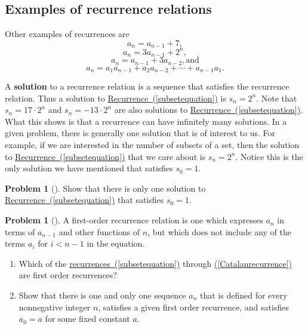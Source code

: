 \documentclass[10pt,]{book}
\newcommand{\terminology}[1]{\textbf{#1}}
\theoremstyle{plain}
\theoremstyle{definition}
\newtheorem{activity}[project]{Problem}
\theoremstyle{definition}
\numberwithin{equation}{chapter}
\newcommand{\lt}{<}
\begin{document}
\subsection[{Examples of recurrence relations}]{Examples of recurrence relations}\label{subsection-17}
Other examples of recurrences are%
\begin{equation}
a_n = a_{n-1} +
7,\label{arithmeticexample}
\end{equation}
%
\begin{equation}
a_n =3a_{n-1} + 2^n,\label{geometricdriven}
\end{equation}
%
\begin{equation}
a_n = a_{n-1} + 3a_{n-2},\mbox{
and}\label{secondorderlinear}
\end{equation}
%
\begin{equation}
a_n= a_1a_{n-1} + a_2a_{n-2}+\cdots +
a_{n-1}a_1.\label{Catalanrecurrence}
\end{equation}
%
\par
A \terminology{solution} to a recurrence relation is a sequence that satisfies the recurrence relation. Thus a solution to \hyperref[subsetequation]{Recurrence~(\ref{subsetequation})} is \(s_n =2^n\). Note that \(s_n=17\cdot2^n\) and \(s_n=-13\cdot2^n\) are also solutions to \hyperref[subsetequation]{Recurrence~(\ref{subsetequation})}. What this shows is that a recurrence can have infinitely many solutions. In a given problem, there is generally one solution that is of interest to us. For example, if we are interested in the number of subsets of a set, then the solution to \hyperref[subsetequation]{Recurrence~(\ref{subsetequation})} that we care about is \(s_n=2^n\). Notice this is the only solution we have mentioned that satisfies \(s_0=1\).%
\begin{activity}[]\marginsymbol[-1em]{} \label{activity-89}
Show that there is only one solution to \hyperref[subsetequation]{Recurrence~(\ref{subsetequation})} that satisfies \(s_0=1\).%
\end{activity}
\begin{activity}[]\marginsymbol[-1em]{} \label{activity-90}
A first-order recurrence relation is one which expresses \(a_n\) in terms of \(a_{n-1}\) and other functions of \(n\), but which does not include any of the terms \(a_i\) for \(i\lt n-1\) in the equation.%
\begin{enumerate}[font=\bfseries,label=(\alph*),ref=\alph*]
\item\label{task-87} \marginsymbol[-2.5em]{} Which of the \hyperref[subsetequation]{recurrences~(\ref{subsetequation})} through \hyperref[Catalanrecurrence]{(\ref{Catalanrecurrence})} are first order recurrences?%
\item\label{task-88} \marginsymbol[-2.5em]{} Show that there is one and only one sequence \(a_n\) that is defined for every nonnegative integer \(n\), satisfies a given first order recurrence, and satisfies \(a_0=a\) for some fixed constant \(a\).%
\end{enumerate}
\end{activity}
\end{document}
